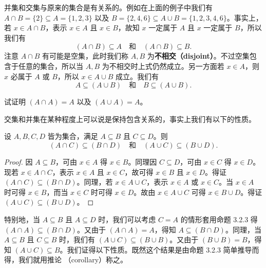 并集和交集与原来的集合是有关系的。例如在上面的例子中我们有 $A \cap B = \{2\} \subseteq A = \{1, 2, 3\}$ 以及 $B = \{2, 4, 6\} \subseteq A \cup B = \{1, 2, 3, 4, 6\}$。事实上，若 $x \in A \cap B$，表示 $x \in A$ 且 $x \in B$，故知 $x$ 一定属于 $A$ 且 $x$ 一定属于 $B$，所以我们有
\begin{equation}
(A \cap B) \subseteq A \quad \text{和} \quad (A \cap B) \subseteq B.
\end{equation}
注意 $A \cap B$ 有可能是空集，此时我们称 $A, B$ 为\textbf{不相交（disjoint）}。不过空集包含于任意的集合，所以当 $A, B$ 为不相交时上式仍然成立。另一方面若 $x \in A$，则 $x$ 必属于 $A$ 或 $B$，所以 $x \in A \cup B$ 成立。我们有
\begin{equation}
A \subseteq (A \cup B) \quad \text{和} \quad B \subseteq (A \cup B).
\end{equation}

\begin{question}
试证明 $(A \cap A) = A$ 以及 $(A \cup A) = A$。
\end{question}

交集和并集在某种程度上可以说是保持包含关系的，事实上我们有以下的性质。

\begin{proposition}
设 $A, B, C, D$ 皆为集合，满足 $A \subseteq B$ 且 $C \subseteq D$。则
$$ (A \cap C) \subseteq (B \cap D) \quad \text{和} \quad (A \cup C) \subseteq (B \cup D). $$
\end{proposition}

\begin{proof}
因 $A \subseteq B$，可由 $x \in A$ 得 $x \in B$。同理因 $C \subseteq D$，可由 $x \in C$ 得 $x \in D$。现若 $x \in A \cap C$，表示 $x \in A$ 且 $x \in C$，故可得 $x \in B$ 且 $x \in D$。得证 $(A \cap C) \subseteq (B \cap D)$。同理，若 $x \in A \cup C$，表示 $x \in A$ 或 $x \in C$。当 $x \in A$ 时可得 $x \in B$，而当 $x \in C$ 时可得 $x \in D$。故由 $x \in A \cup C$ 可得 $x \in B \cup D$。得证 $(A \cup C) \subseteq (B \cup D)$。
\end{proof}

特别地，当 $A \subseteq B$ 且 $A \subseteq D$ 时，我们可以考虑 $C = A$ 的情形套用命题 3.2.3 得 $(A \cap A) \subseteq (B \cap D)$。又由于 $(A \cap A) = A$，得知 $A \subseteq (B \cap D)$。同理，当 $A \subseteq B$ 且 $C \subseteq B$ 时，我们有 $(A \cup C) \subseteq (B \cup B)$。又由于 $(B \cup B) = B$，得知 $(A \cup C) \subseteq B$。我们证得以下性质。既然这个结果是由命题 3.2.3 简单推导而得，我们就用推论 （corollary）称之。

